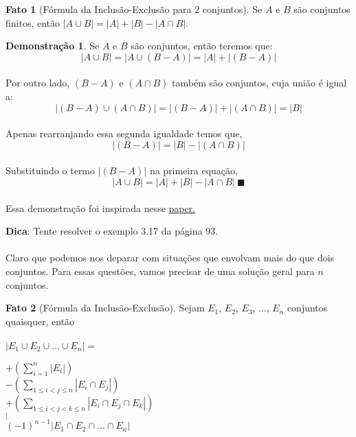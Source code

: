 \documentclass[a4paper,11pt]{book}
\theoremstyle{definition}
\theoremstyle{break}
\newtheorem{fact}{Fato}[section]
\newtheorem{demonstration}{Demonstração}[section]
\begin{document}
\begin{fact}[Fórmula da Inclusão-Exclusão para 2 conjuntos]
Se $A$ e $B$ são conjuntos finitos, então $|A \cup B| = |A| + |B| - |A \cap B|$.
\end{fact}

\begin{demonstration}
Se $A$ e $B$ são conjuntos, então teremos que:
\\
$$ |A \cup B| =  |A \cup (B - A)| = |A| + |(B-A)| $$
\\
Por outro lado, $(B-A)$ e $(A \cap B)$ também são conjuntos, cuja união é igual a:
\\
$$ |(B - A) \cup (A \cap B)| = |(B - A)| + |(A \cap B)| = |B|$$
\\
Apenas rearranjando essa segunda igualdade temos que,
\\
$$ |(B - A)| = |B| - |(A \cap B)| $$
\\
Substituindo o termo $|(B - A)|$ na primeira equação, 
\\
$$ |A \cup B| = |A| + |B| - |A \cap B| \ \blacksquare $$
\\
Essa demonstração foi inspirada nesse \href{https://people.maths.bris.ac.uk/~mb13434/incl_excl_n.pdf}{paper.}

\end{demonstration}

\textbf{Dica}: Tente resolver o exemplo 3.17 da página 93.
\\
\\
Claro que podemos nos deparar com situações que envolvam mais do que dois conjuntos. Para essas questões, vamos precisar de uma solução geral para $n$ conjuntos.

\begin{fact}[Fórmula da Inclusão-Exclusão]
Sejam $E_1$, $E_2$, $E_3$, ..., $E_n$ conjuntos quaisquer, então
\\
\\
$ |E_1 \cup E_2 \cup ... \cup E_n| = $
\begin{center}
$ + \left( \displaystyle \sum_{i = 1}^{n} |E_i| \right)$ \\
$ - \left( \displaystyle \sum_{1 \leq i < j \leq n} |E_i \cap E_j| \right) $ \\
$ + \left( \displaystyle \sum_{1 \leq i < j < k \leq n} |E_i \cap E_j \cap E_k | \right) $ \\
$ \vdots $ \\
\large $ (-1)^{n-1} |E_1 \cap E_2 \cap ... \cap E_n| $ 
\end{center}
\end{fact}
\end{document}
